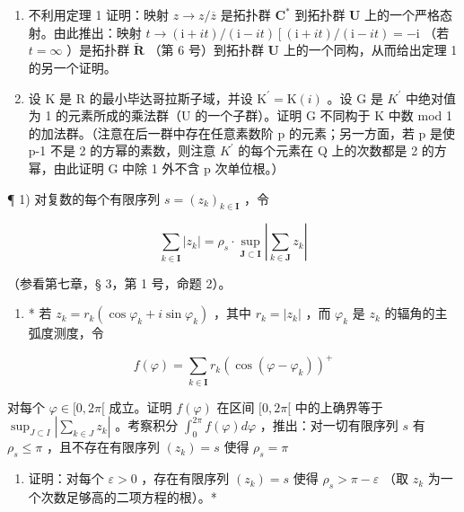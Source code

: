 \begin{enumerate}
\def\labelenumi{\arabic{enumi})}
\setcounter{enumi}{2}
\item
  不利用定理 1 证明：映射 \(z \to z / \overline{z}\) 是拓扑群 \(\mathbf{C}^*\) 到拓扑群 \(\mathbf{U}\) 上的一个严格态射。由此推出：映射 \(t \to (\mathrm{i} + it) / (\mathrm{i} - it) \left[ (\mathrm{i} + it) / (\mathrm{i} - it) = -\mathrm{i} \right.\) （若 \(t = \infty\) ）是拓扑群 \(\tilde{\mathbf{R}}\) （第 6 号）到拓扑群 \(\mathbf{U}\) 上的一个同构，从而给出定理 1 的另一个证明。
\item
  设 K 是 R 的最小毕达哥拉斯子域，并设 \(\mathrm{K}^{\prime}=\mathrm{K}(i)\) 。设 G 是 \(K^{\prime}\) 中绝对值为 1 的元素所成的乘法群（U 的一个子群）。证明 G 不同构于 K 中数 mod 1 的加法群。（注意在后一群中存在任意素数阶 p 的元素；另一方面，若 p 是使 p-1 不是 2 的方幂的素数，则注意 \(K^{\prime}\) 的每个元素在 Q 上的次数都是 2 的方幂，由此证明 G 中除 1 外不含 p 次单位根。）
\end{enumerate}

\ExerciseSection

¶ 1) 对复数的每个有限序列 \(s = (z_k)_{k \in \mathbf{I}}\) ，令

\[
\sum_ {k \in \mathbf {I}} | z _ {k} | = \rho_ {s} \cdot \sup _ {\mathbf {J} \subset \mathbf {I}} \left| \sum_ {k \in \mathbf {J}} z _ {k} \right|
\]

（参看第七章，§ 3，第 1 号，命题 2）。

\begin{enumerate}
\def\labelenumi{\alph{enumi})}
\tightlist
\item
  * 若 \(z_{k} = r_{k} (\cos \varphi_{k} + i \sin \varphi_{k})\) ，其中 \(r_{k} = |z_{k}|\) ，而 \(\varphi_{k}\) 是 \(z_{k}\) 的辐角的主弧度测度，令
\end{enumerate}

\[
f (\varphi) = \sum_ {k \in \mathbf {I}} r _ {k} (\cos (\varphi - \varphi_ {k})) ^ {+}
\]

对每个 \(\varphi \in [0, 2\pi[\) 成立。证明 \(f(\varphi)\) 在区间 \([0, 2\pi[\) 中的上确界等于 \(\sup_{J \subset I} \left| \sum_{k \in J} z_k \right|\) 。考察积分 \(\int_0^{2\pi}f(\varphi)d\varphi\) ，推出：对一切有限序列 \(s\) 有 \(\rho_{s}\leqslant \pi\) ，且不存在有限序列 \((z_k) = s\) 使得 \(\rho_{s} = \pi\)

\begin{enumerate}
\def\labelenumi{\alph{enumi})}
\setcounter{enumi}{1}
\tightlist
\item
  证明：对每个 \(\varepsilon > 0\) ，存在有限序列 \((z_k) = s\) 使得 \(\rho_s > \pi - \varepsilon\) （取 \(z_k\) 为一个次数足够高的二项方程的根）。*
\end{enumerate}

